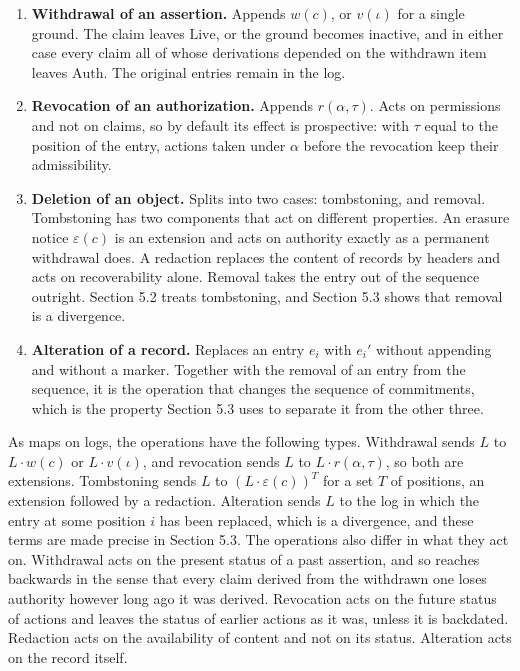 \documentclass[11pt]{article}
\theoremstyle{plain}
\theoremstyle{definition}
\theoremstyle{remark}
\begin{document}
\begin{enumerate}
\item \textbf{Withdrawal of an assertion.} Appends $w(c)$, or $v(\iota)$ for a single ground. The claim leaves $\mathrm{Live}$, or the ground becomes inactive, and in either case every claim all of whose derivations depended on the withdrawn item leaves $\mathrm{Auth}$. The original entries remain in the log.
\item \textbf{Revocation of an authorization.} Appends $r(\alpha,\tau)$. Acts on permissions and not on claims, so by default its effect is prospective: with $\tau$ equal to the position of the entry, actions taken under $\alpha$ before the revocation keep their admissibility.
\item \textbf{Deletion of an object.} Splits into two cases: tombstoning, and removal. Tombstoning has two components that act on different properties. An erasure notice $\varepsilon(c)$ is an extension and acts on authority exactly as a permanent withdrawal does. A redaction replaces the content of records by headers and acts on recoverability alone. Removal takes the entry out of the sequence outright. Section 5.2 treats tombstoning, and Section 5.3 shows that removal is a divergence.
\item \textbf{Alteration of a record.} Replaces an entry $e_i$ with $e_i'$ without appending and without a marker. Together with the removal of an entry from the sequence, it is the operation that changes the sequence of commitments, which is the property Section 5.3 uses to separate it from the other three.
\end{enumerate}

As maps on logs, the operations have the following types. Withdrawal sends $L$ to $L\cdot w(c)$ or $L\cdot v(\iota)$, and revocation sends $L$ to $L\cdot r(\alpha,\tau)$, so both are extensions. Tombstoning sends $L$ to $(L\cdot\varepsilon(c))^T$ for a set $T$ of positions, an extension followed by a redaction. Alteration sends $L$ to the log in which the entry at some position $i$ has been replaced, which is a divergence, and these terms are made precise in Section 5.3. The operations also differ in what they act on. Withdrawal acts on the present status of a past assertion, and so reaches backwards in the sense that every claim derived from the withdrawn one loses authority however long ago it was derived. Revocation acts on the future status of actions and leaves the status of earlier actions as it was, unless it is backdated. Redaction acts on the availability of content and not on its status. Alteration acts on the record itself.
\end{document}
